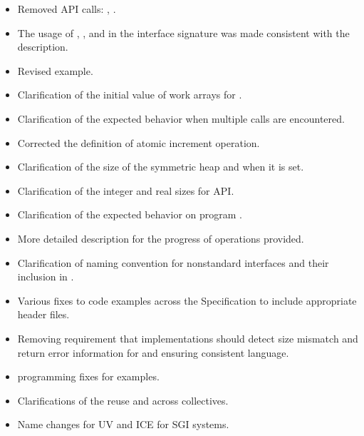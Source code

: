 \begin{itemize}
%
%
\item Removed \ac{API} calls: ,
      .
%
%
\item The usage of , , and  in the
      interface signature was made consistent with the description.
%
%
\item Revised  example.
%
%
\item Clarification of the initial value of  work arrays for
.
%
%
\item Clarification of the expected behavior when multiple 
calls are encountered.
%
%
\item Corrected the definition of atomic increment operation.
%
%
\item Clarification of the size of the symmetric heap and when it is set.
%
%
\item Clarification of the integer and real sizes for \Fortran \ac{API}.
%
%
\item Clarification of the expected behavior on program .
%
%
\item More detailed description for the progress of \openshmem operations
provided.
%
%
\item Clarification of naming convention for nonstandard interfaces and their
inclusion in .
%
%
\item Various fixes to \openshmem code examples across the Specification to
include appropriate header files.
%
\item Removing requirement that implementations should detect size mismatch and
return error information for  and ensuring consistent
language.
%
%
\item \Fortran programming fixes for examples.
%
%
\item Clarifications of the reuse  and  across
collectives.
%
%
\item Name changes for UV and ICE for \ac{SGI} systems.
%
%
\end{itemize}

